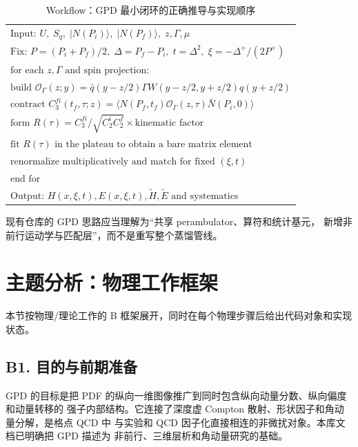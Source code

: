 \documentclass[UTF8]{ctexart}
\begin{document}
\begin{table}[htbp]
\centering
\caption{Workflow：GPD 最小闭环的正确推导与实现顺序}
\small
\begin{tabular}{@{}l@{}}
$\text{Input: } U,\; S_q,\; |N(P_i)\rangle,\; |N(P_f)\rangle,\;z,\Gamma,\mu$ \\
$\text{Fix: } P=(P_i+P_f)/2,\;\Delta=P_f-P_i,\;t=\Delta^2,\;
\xi=-\Delta^+/(2P^+)$ \\
$\text{for each } z,\Gamma \text{ and spin projection:}$ \\
\quad $\text{build } \mathcal O_\Gamma(z;y)
=\bar q(y-z/2)\Gamma W(y-z/2,y+z/2)q(y+z/2)$ \\
\quad $\text{contract } C_3^{fi}(t_f,\tau;z)
=\langle N(P_f,t_f)\mathcal O_\Gamma(z,\tau)\bar N(P_i,0)\rangle$ \\
\quad $\text{form } R(\tau)=C_3^{fi}/\sqrt{C_2^iC_2^f}
\times\text{kinematic factor}$ \\
\quad $\text{fit } R(\tau)\text{ in the plateau to obtain a bare matrix element}$ \\
\quad $\text{renormalize multiplicatively and match for fixed }(\xi,t)$ \\
$\text{end for}$ \\
$\text{Output: } H(x,\xi,t),E(x,\xi,t),\widetilde H,\widetilde E
\text{ and systematics}$
\end{tabular}
\end{table}

\begin{ideabox}
现有仓库的 GPD 思路应当理解为“共享 perambulator、算符和统计基元，
新增非前行运动学与匹配层”，而不是重写整个蒸馏管线。
\end{ideabox}

\section{主题分析：物理工作框架}

本节按物理/理论工作的 B 框架展开，同时在每个物理步骤后给出代码对象和实现状态。

\subsection{B1. 目的与前期准备}

GPD 的目标是把 PDF 的纵向一维图像推广到同时包含纵向动量分数、纵向偏度和动量转移的
强子内部结构。它连接了深度虚 Compton 散射、形状因子和角动量分解，是格点 QCD 中
与实验和 QCD 因子化直接相连的非微扰对象。本库文档已明确把 GPD 描述为
非前行、三维层析和角动量研究的基础。 \cite{D3,D4}
\end{document}
